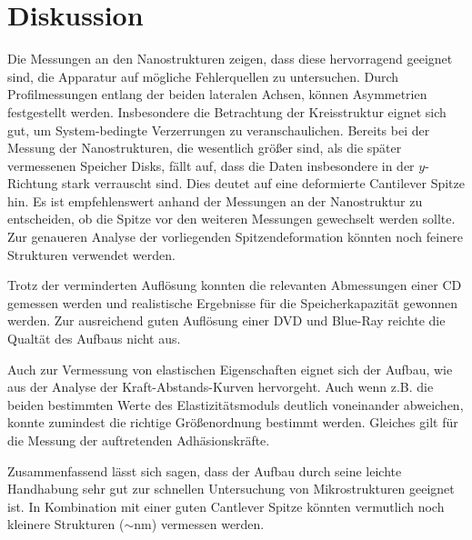 \newpage
\section{Diskussion}
Die Messungen an den Nanostrukturen zeigen, dass diese hervorragend geeignet sind, die Apparatur auf
mögliche Fehlerquellen zu untersuchen. Durch Profilmessungen entlang der beiden lateralen Achsen,
können Asymmetrien festgestellt werden. Insbesondere die Betrachtung der Kreisstruktur eignet sich
gut, um System-bedingte Verzerrungen zu veranschaulichen. Bereits bei der Messung der Nanostrukturen,
die wesentlich größer sind, als die später vermessenen Speicher Disks, fällt auf, dass die
Daten insbesondere in der $y$-Richtung stark verrauscht sind. Dies deutet auf eine deformierte
Cantilever Spitze hin. Es ist empfehlenswert anhand der Messungen an der Nanostruktur zu entscheiden,
ob die Spitze vor den weiteren Messungen gewechselt werden sollte. Zur genaueren Analyse der vorliegenden
Spitzendeformation könnten noch feinere Strukturen verwendet werden.

Trotz der verminderten Auflösung konnten die relevanten Abmessungen einer CD gemessen werden und realistische
Ergebnisse für die Speicherkapazität gewonnen werden. Zur ausreichend guten Auflösung einer
DVD und Blue-Ray reichte die Qualtät des Aufbaus nicht aus.

Auch zur Vermessung von elastischen Eigenschaften eignet sich der Aufbau, wie aus der Analyse der
Kraft-Abstands-Kurven hervorgeht. Auch wenn z.B. die beiden bestimmten Werte des Elastizitätsmoduls
deutlich voneinander abweichen, konnte zumindest die richtige Größenordnung bestimmt werden. Gleiches gilt
für die Messung der auftretenden Adhäsionskräfte.

Zusammenfassend lässt sich sagen, dass der Aufbau durch seine leichte Handhabung sehr gut zur schnellen
Untersuchung von Mikrostrukturen geeignet ist. In Kombination
mit einer guten Cantlever Spitze könnten vermutlich noch kleinere Strukturen ($\sim \si{\nano\meter}$) vermessen werden.
